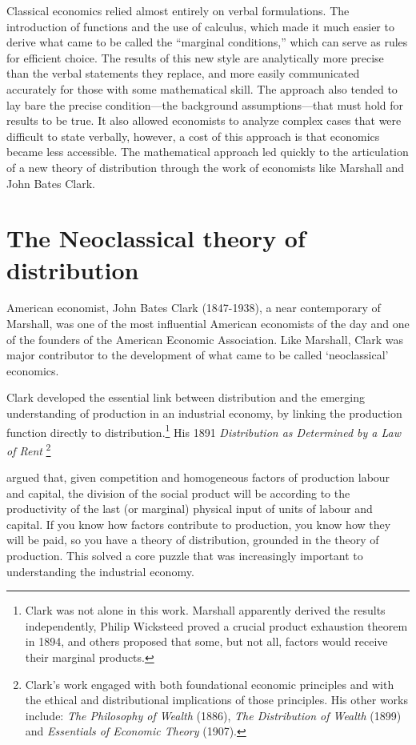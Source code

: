 
Classical economics relied almost entirely on verbal formulations. The introduction of functions and the use of calculus, which  made it much easier to  derive what came to be called the ``marginal conditions,'' which can serve as rules for efficient choice. The results of this new style are analytically more precise than the verbal statements they replace, and more easily communicated accurately for those with some mathematical skill. The approach also tended to lay bare the precise condition---the background assumptions---that must hold for results to be true. It also allowed economists to analyze complex cases that were difficult to state verbally, however, a cost of this approach is that economics became less accessible. The mathematical approach led quickly to the articulation of a new theory of distribution through the work of economists like Marshall and John Bates Clark.

\section{The Neoclassical theory of distribution}
American economist, John Bates Clark (1847-1938), a near contemporary of Marshall, was one of the most influential American economists of the day and one of the founders of the American Economic Association.  Like Marshall, Clark was major contributor to the development of what came to be called `neoclassical' economics. 

Clark developed the essential link between distribution and the emerging understanding of production in an industrial economy, by linking the production function directly to distribution.\footnote{Clark was not alone in this work. Marshall apparently derived the results independently, Philip Wicksteed proved a crucial product exhaustion theorem in 1894, and others proposed that some, but not all, factors would receive their marginal products.} His 1891 \textit{Distribution as Determined by a Law of Rent} \cite{clarkDistributionDeterminedLaw1891}\footnote{Clark's work engaged with both foundational economic principles and with the ethical and distributional implications of those principles. His other works include: \textit{The Philosophy of Wealth} (1886), \textit{The Distribution of Wealth} (1899) and \textit{Essentials of Economic Theory} (1907).}

 argued that, given competition and homogeneous factors of production labour and capital, the division of the social product will be according to the productivity of the last (or marginal) physical input of units of labour and capital. If you know how factors contribute to production, you know how they will be paid, so you have a theory of distribution, grounded in the theory of production. This solved a core puzzle that was increasingly important to understanding the industrial economy.

